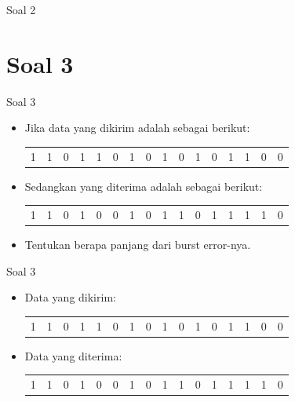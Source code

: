 \documentclass[aspectratio=169]{beamer}
\begin{document}
\begin{frame}[t]{Soal 2}
	
\end{frame}


\section{Soal 3}

\begin{frame}[t]{Soal 3}
	\begin{itemize}
		\item Jika data yang dikirim adalah sebagai berikut:\\
		
		\begin{tabular}{cccccccccccccccc}
			1 & 1 & 0 & 1 & 1 & 0 & 1 & 0 & 1 & 0 & 1 & 0 & 1 & 1 & 0 & 0 \\
		\end{tabular}
	
		\item Sedangkan yang diterima adalah sebagai berikut: \\
		
		\begin{tabular}{cccccccccccccccc}
			1 & 1 & 0 & 1 & 0 & 0 & 1 & 0 & 1 & 1 & 0 & 1 & 1 & 1 & 1 & 0 \\
		\end{tabular}
		\item Tentukan berapa panjang dari burst error-nya.
	\end{itemize}
\end{frame}

\begin{frame}[t]{Soal 3}
	\begin{itemize}
		\item Data yang dikirim:\\
		
		\begin{tabular}{cccccccccccccccc}
			1 & 1 & 0 & 1 & 1 & 0 & 1 & 0 & 1 & 0 & 1 & 0 & 1 & 1 & 0 & 0 \\
		\end{tabular}
		
		\item Data yang diterima: \\
		
		\begin{tabular}{cccccccccccccccc}
			1 & 1 & 0 & 1 & 0 & 0 & 1 & 0 & 1 & 1 & 0 & 1 & 1 & 1 & 1 & 0 \\
		\end{tabular}
	
	\end{itemize}
\end{frame}
\end{document}
